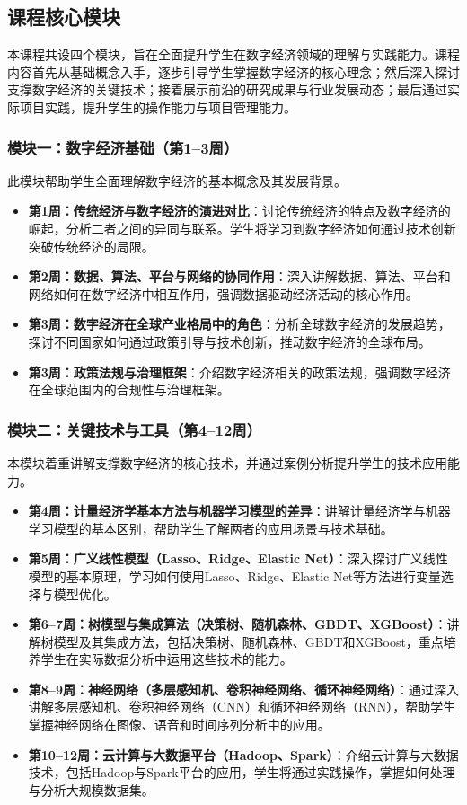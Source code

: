 \documentclass[lang=cn,12pt,a4paper]{elegantpaper}
\begin{document}
\subsection{课程核心模块} \label{sec:modules}
本课程共设四个模块，旨在全面提升学生在数字经济领域的理解与实践能力。课程内容首先从基础概念入手，逐步引导学生掌握数字经济的核心理念；然后深入探讨支撑数字经济的关键技术；接着展示前沿的研究成果与行业发展动态；最后通过实际项目实践，提升学生的操作能力与项目管理能力。

\subsubsection{模块一：数字经济基础（第1--3周）} \label{sec:module1}
此模块帮助学生全面理解数字经济的基本概念及其发展背景。
\begin{itemize}
    \item \textbf{第1周：传统经济与数字经济的演进对比}：讨论传统经济的特点及数字经济的崛起，分析二者之间的异同与联系。学生将学习到数字经济如何通过技术创新突破传统经济的局限。
    \item \textbf{第2周：数据、算法、平台与网络的协同作用}：深入讲解数据、算法、平台和网络如何在数字经济中相互作用，强调数据驱动经济活动的核心作用。
    \item \textbf{第3周：数字经济在全球产业格局中的角色}：分析全球数字经济的发展趋势，探讨不同国家如何通过政策引导与技术创新，推动数字经济的全球布局。
    \item \textbf{第3周：政策法规与治理框架}：介绍数字经济相关的政策法规，强调数字经济在全球范围内的合规性与治理框架。
\end{itemize}

\subsubsection{模块二：关键技术与工具（第4--12周）} \label{sec:module2}
本模块着重讲解支撑数字经济的核心技术，并通过案例分析提升学生的技术应用能力。
\begin{itemize}
    \item \textbf{第4周：计量经济学基本方法与机器学习模型的差异}：讲解计量经济学与机器学习模型的基本区别，帮助学生了解两者的应用场景与技术基础。
    \item \textbf{第5周：广义线性模型（Lasso、Ridge、Elastic Net）}：深入探讨广义线性模型的基本原理，学习如何使用Lasso、Ridge、Elastic Net等方法进行变量选择与模型优化。
    \item \textbf{第6--7周：树模型与集成算法（决策树、随机森林、GBDT、XGBoost）}：讲解树模型及其集成方法，包括决策树、随机森林、GBDT和XGBoost，重点培养学生在实际数据分析中运用这些技术的能力。
    \item \textbf{第8--9周：神经网络（多层感知机、卷积神经网络、循环神经网络）}：通过深入讲解多层感知机、卷积神经网络（CNN）和循环神经网络（RNN），帮助学生掌握神经网络在图像、语音和时间序列分析中的应用。
    \item \textbf{第10--12周：云计算与大数据平台（Hadoop、Spark）}：介绍云计算与大数据技术，包括Hadoop与Spark平台的应用，学生将通过实践操作，掌握如何处理与分析大规模数据集。
\end{itemize}
\end{document}
